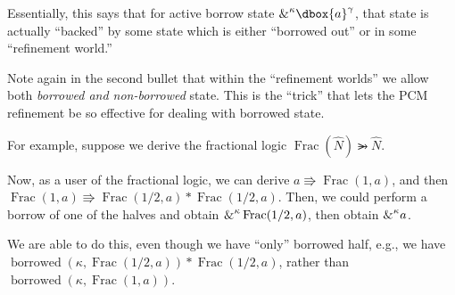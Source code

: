 \documentclass{article}
\newcommand\dboxed[1]{\dbox{\vphantom{t}\ensuremath{#1}}}
\newcommand{\viewshift}{\Rrightarrow}
\DeclareMathOperator{\Frac}{Frac}
\newcommand{\borrow}[2]{\textsc{\&}^{#1}#2}
\newcommand{\refines}{\rightarrowgtr}
\DeclareMathOperator{\borrowed}{borrowed}
\begin{document}
Essentially, this says that for active borrow state $\borrow{\kappa}{\dboxed{a}^\gamma}$,
that state is actually ``backed'' by some state which is either ``borrowed out'' or
in some ``refinement world.''

Note again in the second bullet that within the ``refinement worlds'' we allow both
\emph{borrowed and non-borrowed} state. This is the ``trick'' that lets the
PCM refinement be so effective for dealing with borrowed state.

For example, suppose we derive the fractional logic
$\Frac(\widehat{N}) \refines \widehat{N}$.

Now, as a user of the fractional logic, we can derive $a \viewshift \Frac(1, a)$,
and then $\Frac(1, a) \viewshift \Frac(1/2, a) * \Frac(1/2, a)$.
Then, we could perform a borrow of one of the halves and obtain
$\borrow{\kappa}{\Frac(1/2, a)}$,
then obtain $\borrow{\kappa}{a}$.

We are able to do this, even though we have ``only'' borrowed half, e.g.,
we have $\borrowed(\kappa, \Frac(1/2, a)) * \Frac(1/2, a)$, rather than
$\borrowed(\kappa, \Frac(1, a))$.
\end{document}
